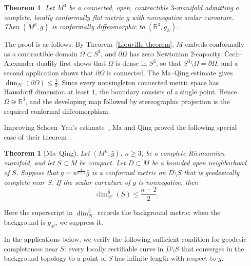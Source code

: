 \documentclass[12pt,oneside,a4paper]{article}
\theoremstyle{mytheorem}
\newtheorem{theorem}[definition]{Theorem}
\theoremstyle{remark}
\theoremstyle{definition}
\begin{document}
\begin{theorem}\label{contractible}
Let \( M^3 \) be a connected, open, contractible \(3\)-manifold admitting a complete, locally conformally flat metric \(g\) with nonnegative scalar curvature.
Then \( (M^3,g) \) is conformally diffeomorphic to \( (\mathbb{R}^3, g_E) \).
\end{theorem}

The proof is as follows. By Theorem~\ref{Liouville theorem}, \(M\) embeds conformally as a contractible domain \(\Omega\subset S^3\), and \(\partial\Omega\) has zero Newtonian \(2\)-capacity. \v{C}ech--Alexander duality first shows that \(\Omega\) is dense in \(S^3\), so that \(S^3\setminus\Omega=\partial\Omega\), and a second application shows that \(\partial\Omega\) is connected. The Ma--Qing estimate gives \(\dim_{\mathcal H}(\partial\Omega)\leq\frac12\). Since every nonsingleton connected metric space has Hausdorff dimension at least \(1\), the boundary consists of a single point. Hence \(\Omega\cong\mathbb R^3\), and the developing map followed by stereographic projection is the required conformal diffeomorphism.

Improving Schoen--Yau's estimate~\cite[Theorem~2.7]{zbMATH04075988}, Ma and Qing proved the following special case of their theorem~\cite[Theorem~1.3]{zbMATH08016940}.
\begin{theorem}[Ma--Qing]\label{Ma}
Let \((M^n,\bar g)\), \(n\geq3\), be a complete Riemannian manifold, and let \(S\subset M\) be compact. Let \(D\subset M\) be a bounded open neighborhood of \(S\). Suppose that
\(g=u^{\frac{4}{n-2}}\bar g\) is a conformal metric on \(D\setminus S\) that is geodesically complete near \(S\). If the scalar curvature of \(g\) is nonnegative, then
\[
\dim_{\mathcal{H}}^{\bar g}(S) \le \frac{n-2}{2}.
\]
\end{theorem}

Here the superscript in \(\dim_{\mathcal H}^{\bar g}\) records the background
metric; when the background is \(g_{st}\), we suppress it.

In the applications below, we verify the following sufficient condition for
geodesic completeness near \(S\): every locally rectifiable curve in
\(D\setminus S\) that converges in the background topology to a point of \(S\)
has infinite length with respect to \(g\).
\end{document}
